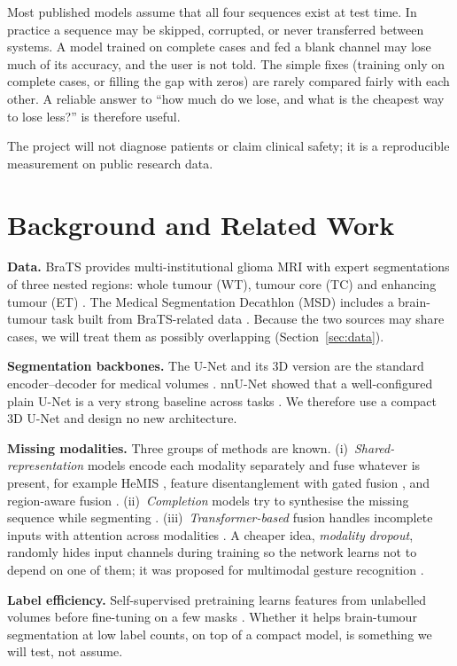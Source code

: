 \documentclass[11pt,a4paper]{article}
\begin{document}
Most published models assume that all four sequences exist at test time. In practice a sequence may be skipped, corrupted, or never transferred between systems. A model trained on complete cases and fed a blank channel may lose much of its accuracy, and the user is not told. The simple fixes (training only on complete cases, or filling the gap with zeros) are rarely compared fairly with each other. A reliable answer to ``how much do we lose, and what is the cheapest way to lose less?'' is therefore useful.

The project will not diagnose patients or claim clinical safety; it is a reproducible measurement on public research data.

\section{Background and Related Work}
\textbf{Data.} BraTS provides multi-institutional glioma MRI with expert segmentations of three nested regions: whole tumour (WT), tumour core (TC) and enhancing tumour (ET) \cite{menze2015,bakas2017,baid2021}. The Medical Segmentation Decathlon (MSD) includes a brain-tumour task built from BraTS-related data \cite{antonelli2022}. Because the two sources may share cases, we will treat them as possibly overlapping (Section~\ref{sec:data}).

\textbf{Segmentation backbones.} The U-Net and its 3D version are the standard encoder--decoder for medical volumes \cite{ronneberger2015,cicek2016}. nnU-Net showed that a well-configured plain U-Net is a very strong baseline across tasks \cite{isensee2021}. We therefore use a compact 3D U-Net and design no new architecture.

\textbf{Missing modalities.} Three groups of methods are known. (i)~\emph{Shared-representation} models encode each modality separately and fuse whatever is present, for example HeMIS \cite{havaei2016}, feature disentanglement with gated fusion \cite{chen2019}, and region-aware fusion \cite{ding2021}. (ii)~\emph{Completion} models try to synthesise the missing sequence while segmenting \cite{dorent2019}. (iii)~\emph{Transformer-based} fusion handles incomplete inputs with attention across modalities \cite{zhang2022}. A cheaper idea, \emph{modality dropout}, randomly hides input channels during training so the network learns not to depend on one of them; it was proposed for multimodal gesture recognition \cite{neverova2016}.

\textbf{Label efficiency.} Self-supervised pretraining learns features from unlabelled volumes before fine-tuning on a few masks \cite{zhou2021,tang2022}. Whether it helps brain-tumour segmentation at low label counts, on top of a compact model, is something we will test, not assume.
\end{document}
